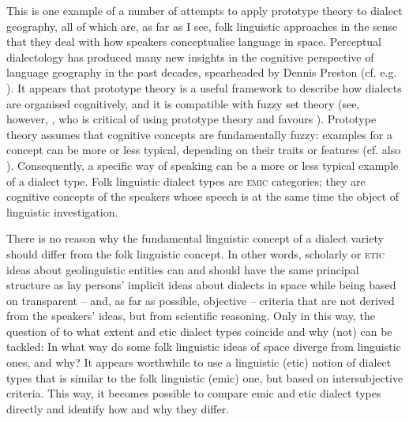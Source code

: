 \documentclass[output=paper]{LSP/langsci}
\begin{document}
This is one example of a number of attempts to apply prototype theory \citep{rosch_natural_1973,lakoff_women_1987} to dialect geography, all of which are, as far as I see, folk linguistic approaches \citep{christen_dialekt_1998,anders_was_2010,klausmann_wie_2006,kristiansen_style-shifting_2008,beeching_prototype-theoretic_2009} in the sense that they deal with how speakers conceptualise language in space. Perceptual dialectology has produced many new insights in the cognitive perspective of language geography in the past decades, spearheaded by Dennis Preston (cf. e.g. \citealt{preston_perceptual_1989,preston_handbook_1999,anders_perceptual_2010}). It appears that prototype theory is a useful framework to describe how dialects are organised cognitively, and it is compatible with fuzzy set theory (see, however, \citealt[218--250]{kretzschmar_linguistics_2009}, who is critical of using prototype theory and favours ). Prototype theory assumes that cognitive concepts are fundamentally fuzzy: examples for a concept can be more or less typical, depending on their traits or features (cf. also \citealt{bailey_boundaries_1973}). Consequently, a specific way of speaking can be a more or less typical example of a dialect type. Folk linguistic dialect types are \textsc{emic} categories; they are cognitive concepts of the speakers whose speech is at the same time the object of linguistic investigation.

There is no reason why the fundamental linguistic concept of a dialect variety should differ from the folk linguistic concept. In other words, scholarly or \textsc{etic} ideas about geolinguistic entities can and should have the same principal structure as lay persons’ implicit ideas about dialects in space while being based on transparent – and, as far as possible, objective – criteria that are not derived from the speakers’ ideas, but from scientific reasoning. Only in this way, the question of to what extent  and etic dialect types coincide and why (not) can be tackled: In what way do some folk linguistic ideas of space diverge from linguistic ones, and why? It appears worthwhile to use a linguistic (etic) notion of dialect types that is similar to the folk linguistic (emic) one, but based on intersubjective criteria. This way, it becomes possible to compare emic and etic dialect types directly and identify how and why they differ. 
\end{document}
